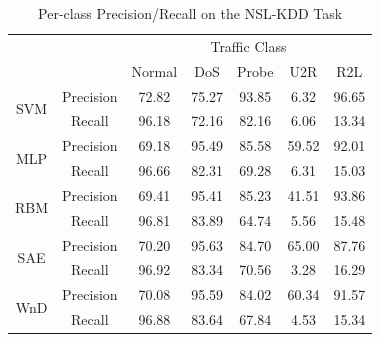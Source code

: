 \begin{table}[tbp]
    \centering
    \caption{Per-class Precision/Recall on the NSL-KDD Task}
    \label{CDL:Tab:PrecisionRecall}
    \begin{tabular}{c|c|ccccc}
        \hline
        \hline
                             &            & \multicolumn{5}{c}{Traffic Class} \\
        \cline{3-7}
                             &            & Normal & DoS   & Probe & U2R   & R2L \\
        \hline
        \multirow{2}{*}{SVM} & Precision  & 72.82  & 75.27 & 93.85 &  6.32 & 96.65 \\
        \cline{2-2}
                             & Recall     & 96.18  & 72.16 & 82.16 &  6.06 & 13.34 \\
        \hline
        \multirow{2}{*}{MLP} & Precision  & 69.18  & 95.49 & 85.58 & 59.52 & 92.01 \\
        \cline{2-2}
                             & Recall     & 96.66  & 82.31 & 69.28 &  6.31 & 15.03 \\
        \hline
        \multirow{2}{*}{RBM} & Precision  & 69.41  & 95.41 & 85.23 & 41.51 & 93.86 \\
        \cline{2-2}
                             & Recall     & 96.81  & 83.89 & 64.74 &  5.56 & 15.48 \\
        \hline
        \multirow{2}{*}{SAE} & Precision  & 70.20  & 95.63 & 84.70 & 65.00 & 87.76 \\
        \cline{2-2}
                             & Recall     & 96.92  & 83.34 & 70.56 &  3.28 & 16.29 \\
        \hline
        \multirow{2}{*}{WnD} & Precision  & 70.08  & 95.59 & 84.02 & 60.34 & 91.57 \\
        \cline{2-2}
                             & Recall     & 96.88  & 83.64 & 67.84 &  4.53 & 15.34 \\
        \hline
    \end{tabular}
\end{table}


